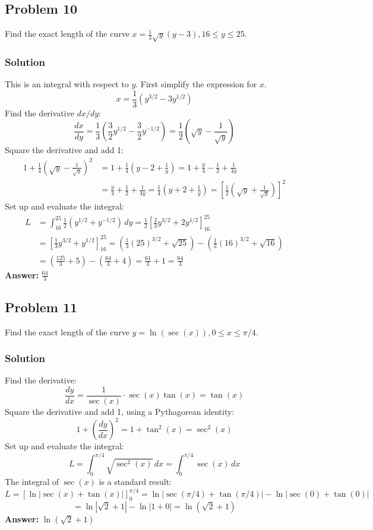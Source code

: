 \documentclass{article}
\begin{document}
\subsection{Problem 10}
Find the exact length of the curve $ x = \frac{1}{3}\sqrt{y}(y-3), 16 \le y \le 25 $.
\subsubsection*{Solution}
This is an integral with respect to $y$. First simplify the expression for $x$.
\[ x = \frac{1}{3}(y^{3/2} - 3y^{1/2}) \]
Find the derivative $ dx/dy $:
\[ \frac{dx}{dy} = \frac{1}{3}\left(\frac{3}{2}y^{1/2} - \frac{3}{2}y^{-1/2}\right) = \frac{1}{2}\left(\sqrt{y} - \frac{1}{\sqrt{y}}\right) \]
Square the derivative and add 1:
\begin{align*}
    1 + \frac{1}{4}\left(\sqrt{y} - \frac{1}{\sqrt{y}}\right)^2 &= 1 + \frac{1}{4}\left(y - 2 + \frac{1}{y}\right) = 1 + \frac{y}{4} - \frac{1}{2} + \frac{1}{4y} \\
    &= \frac{y}{4} + \frac{1}{2} + \frac{1}{4y} = \frac{1}{4}\left(y+2+\frac{1}{y}\right) = \left[\frac{1}{2}\left(\sqrt{y}+\frac{1}{\sqrt{y}}\right)\right]^2
\end{align*}
Set up and evaluate the integral:
\begin{align*}
    L &= \int_{16}^{25} \frac{1}{2}\left(y^{1/2} + y^{-1/2}\right) \,dy = \frac{1}{2}\left[\frac{2}{3}y^{3/2} + 2y^{1/2}\right]_{16}^{25} \\
    &= \left[\frac{1}{3}y^{3/2} + y^{1/2}\right]_{16}^{25} = \left(\frac{1}{3}(25)^{3/2} + \sqrt{25}\right) - \left(\frac{1}{3}(16)^{3/2} + \sqrt{16}\right) \\
    &= \left(\frac{125}{3} + 5\right) - \left(\frac{64}{3} + 4\right) = \frac{61}{3} + 1 = \frac{64}{3}
\end{align*}
\textbf{Answer:} $ \frac{64}{3} $

\subsection{Problem 11}
Find the exact length of the curve $ y = \ln(\sec(x)), 0 \le x \le \pi/4 $.
\subsubsection*{Solution}
Find the derivative:
\[ \frac{dy}{dx} = \frac{1}{\sec(x)} \cdot \sec(x)\tan(x) = \tan(x) \]
Square the derivative and add 1, using a Pythagorean identity:
\[ 1 + \left(\frac{dy}{dx}\right)^2 = 1 + \tan^2(x) = \sec^2(x) \]
Set up and evaluate the integral:
\[ L = \int_{0}^{\pi/4} \sqrt{\sec^2(x)} \,dx = \int_{0}^{\pi/4} \sec(x) \,dx \]
The integral of $ \sec(x) $ is a standard result:
\[ L = [\ln|\sec(x)+\tan(x)|]_{0}^{\pi/4} = \ln|\sec(\pi/4)+\tan(\pi/4)| - \ln|\sec(0)+\tan(0)| \]
\[ = \ln|\sqrt{2}+1| - \ln|1+0| = \ln(\sqrt{2}+1) \]
\textbf{Answer:} $ \ln(\sqrt{2}+1) $
\end{document}
